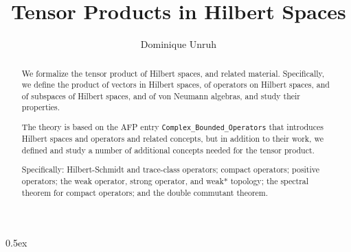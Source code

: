 \documentclass[11pt,a4paper]{article}
\begin{document}
\title{Tensor Products in Hilbert Spaces}
\author{Dominique Unruh}
\maketitle

\begin{abstract}
  We formalize the tensor product of Hilbert spaces, and related material.
  Specifically, we define the product of vectors in Hilbert spaces, of operators on Hilbert spaces, and of subspaces of Hilbert spaces, and of von Neumann algebras, and study their properties.

  The theory is based on the AFP entry \texttt{Complex\_Bounded\_Operators} that introduces Hilbert spaces and operators and related concepts, but in addition to their work, we defined and study a number of additional concepts needed for the tensor product.

  Specifically: Hilbert-Schmidt and trace-class operators; compact operators; positive operators; the weak operator, strong operator, and weak* topology; the spectral theorem for compact operators; and the double commutant theorem.
\end{abstract}

\tableofcontents

\parindent 0pt\parskip 0.5ex





\end{document}
